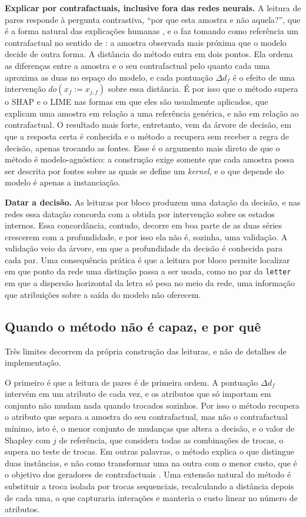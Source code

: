 \textbf{Explicar por contrafactuais, inclusive fora das redes neurais.} A leitura de pares responde à pergunta contrastiva, ``por que esta amostra e não aquela?'', que é a forma natural das explicações humanas \citep{Miller2019}, e o faz tomando como referência um contrafactual no sentido de \cite{Guidotti2022}: a amostra observada mais próxima que o modelo decide de outra forma. A distância do método entra em dois pontos. Ela ordena as diferenças entre a amostra e o seu contrafactual pelo quanto cada uma aproxima as duas no espaço do modelo, e cada pontuação $\Delta d_f$ é o efeito de uma intervenção $do(x_f := x_{j,f})$ sobre essa distância. É por isso que o método supera o SHAP e o LIME nas formas em que eles são usualmente aplicados, que explicam uma amostra em relação a uma referência genérica, e não em relação ao contrafactual. O resultado mais forte, entretanto, vem da árvore de decisão, em que a resposta certa é conhecida e o método a recupera sem receber a regra de decisão, apenas trocando as fontes. Esse é o argumento mais direto de que o método é modelo-agnóstico: a construção exige somente que cada amostra possa ser descrita por fontes sobre as quais se define um \textit{kernel}, e o que depende do modelo é apenas a instanciação.

\textbf{Datar a decisão.} As leituras por bloco produzem uma datação da decisão, e nas redes essa datação concorda com a obtida por intervenção sobre os estados internos. Essa concordância, contudo, decorre em boa parte de as duas séries crescerem com a profundidade, e por isso ela não é, sozinha, uma validação. A validação veio da árvore, em que a profundidade da decisão é conhecida para cada par. Uma consequência prática é que a leitura por bloco permite localizar em que ponto da rede uma distinção passa a ser usada, como no par da \texttt{letter} em que a dispersão horizontal da letra só pesa no meio da rede, uma informação que atribuições sobre a saída do modelo não oferecem.

\subsection{Quando o método não é capaz, e por quê}\label{subsec:disc_limites}

Três limites decorrem da própria construção das leituras, e não de detalhes de implementação.

O primeiro é que a leitura de pares é de primeira ordem. A pontuação $\Delta d_f$ intervém em um atributo de cada vez, e os atributos que só importam em conjunto não mudam nada quando trocados sozinhos. Por isso o método recupera o atributo que separa a amostra do seu contrafactual, mas não o contrafactual mínimo, isto é, o menor conjunto de mudanças que altera a decisão, e o valor de Shapley com $j$ de referência, que considera todas as combinações de trocas, o supera no teste de trocas. Em outras palavras, o método explica o que distingue duas instâncias, e não como transformar uma na outra com o menor custo, que é o objetivo dos geradores de contrafactuais \citep{Wachter2018, Guidotti2022}. Uma extensão natural do método é substituir a troca isolada por trocas sequenciais, recalculando a distância depois de cada uma, o que capturaria interações e manteria o custo linear no número de atributos.

